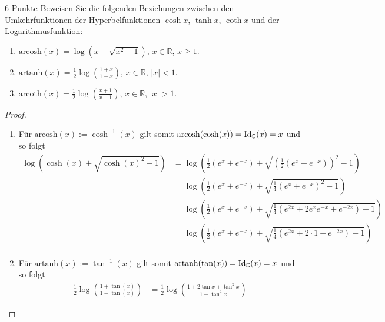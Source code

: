 \documentclass{problemset}
\begin{document}
\begin{problem}[Areafunktionen]{6 Punkte}
Beweisen Sie die folgenden Beziehungen zwischen den Umkehrfunktionen der Hyperbelfunktionen $\cosh x$, $\tanh x$, $\coth x$ und der Logarithmusfunktion:

\begin{enumerate}
    \item $\text{arcosh}(x) = \log(x + \sqrt{x^2 - 1})$, $x \in \mathbb{R}$, $x \geq 1$.

    \item $\text{artanh}(x) = \frac{1}{2} \log\left(\frac{1+x}{1-x}\right)$, $x \in \mathbb{R}$, $|x| < 1$.

    \item $\text{arcoth}(x) = \frac{1}{2} \log\left(\frac{x+1}{x-1}\right)$, $x \in \mathbb{R}$, $|x| > 1$.
\end{enumerate}

\begin{proof}
    \begin{enumerate}
        \item Für $\text{arcosh}(x) := \cosh^{-1}(x)$ gilt somit
              $\text{arcosh}(\cosh(x)) = \operatorname{Id}_{\mathbb{C}}(x) = x$ und so folgt
              \begin{align*}
                  \log (\cosh(x) + \sqrt{\cosh(x)^2 - 1}) & = \log\left(\frac{1}{2}(e^x + e^{-x}) + \sqrt{{\left(\frac{1}{2}(e^x + e^{-x})\right)}^2 - 1}\right) \\
                                                          & = \log\left(\frac{1}{2}(e^x + e^{-x}) + \sqrt{\frac{1}{4}{(e^x + e^{-x})}^2 - 1}\right)              \\
                                                          & = \log\left(\frac{1}{2}(e^x + e^{-x}) + \sqrt{\frac{1}{4}(e^{2x} + 2e^xe^{-x} + e^{-2x}) - 1}\right) \\
                                                          & = \log\left(\frac{1}{2}(e^x + e^{-x}) + \sqrt{\frac{1}{4}(e^{2x} + 2\cdot 1 + e^{-2x}) - 1}\right)   \\
              \end{align*}

        \item Für $\text{artanh}(x) := \tan^{-1}(x)$ gilt somit
              $\text{artanh}(\tan(x)) = \operatorname{Id}_{\mathbb{C}}(x) = x$ und so folgt
              \begin{align*}
                  \frac{1}{2} \log \left(\frac{1 + \tan(x)}{1 - \tan(x)}\right) & = \frac{1}{2} \log \left(\frac{1 + 2\tan x + \tan^2 x }{1 - \tan^2 x }\right)
              \end{align*}
    \end{enumerate}
\end{proof}

\end{problem}
\end{document}
